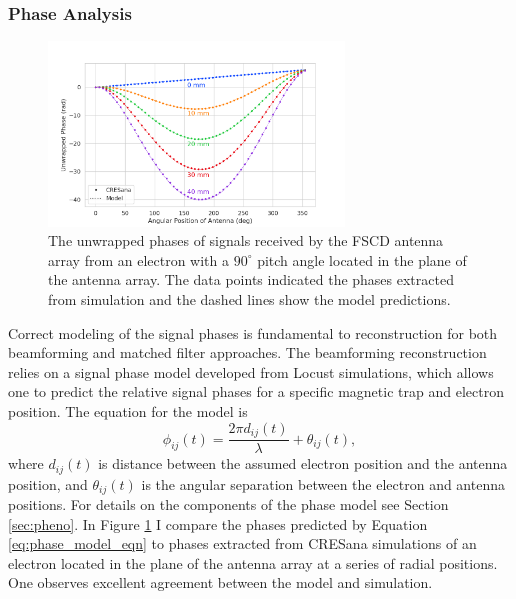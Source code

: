 \subsubsection{Phase Analysis}

\begin{figure}[htbp]
    \centering
    \includegraphics[width=0.7\textwidth]{figs/Chapter-5/230504_cresana_phases.png}
    \caption{The unwrapped phases of signals received by the FSCD antenna array from an electron with a $90^\circ$ pitch angle located in the plane of the antenna array. The data points indicated the phases extracted from simulation and the dashed lines show the model predictions. }
    \label{fig:cresana_simulated_phases}
\end{figure}

Correct modeling of the signal phases is fundamental to reconstruction for both beamforming and matched filter approaches. The beamforming reconstruction relies on a signal phase model developed from Locust simulations, which allows one to predict the relative signal phases for a specific magnetic trap and electron position. The equation for the model is
\begin{equation}
    \phi_{ij}(t) = \frac{2\pi d_{ij}(t)}{\lambda} + \theta_{ij}(t),
    \label{eq:phase_model_eqn}
\end{equation}
where $d_{ij}(t)$ is distance between the assumed electron position and the antenna position, and $\theta_{ij}(t)$ is the angular separation between the electron and antenna positions. For details on the components of the phase model see Section \ref{sec:pheno}. In Figure \ref{fig:cresana_simulated_phases} I compare the phases predicted by Equation \ref{eq:phase_model_eqn} to phases extracted from CRESana simulations of an electron located in the plane of the antenna array at a series of radial positions. One observes excellent agreement between the model and simulation.

